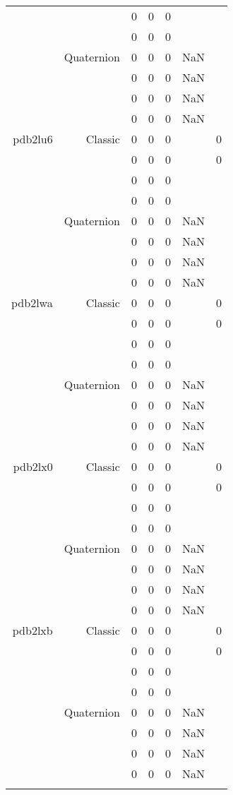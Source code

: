 \begin{xltabular}{\textwidth}{r|rcccSc}
& & 0 & 0 & 0 & & \\
& & 0 & 0 & 0 & & \\
& Quaternion & 0 & 0 & 0 & NaN & \\
& & 0 & 0 & 0 & NaN & \\
& & 0 & 0 & 0 & NaN & \\
& & 0 & 0 & 0 & NaN & \\ \addlinespace
pdb2lu6 & Classic & 0 & 0 & 0 & & 0 \\
& & 0 & 0 & 0 & & 0 \\
& & 0 & 0 & 0 & & \\
& & 0 & 0 & 0 & & \\
& Quaternion & 0 & 0 & 0 & NaN & \\
& & 0 & 0 & 0 & NaN & \\
& & 0 & 0 & 0 & NaN & \\
& & 0 & 0 & 0 & NaN & \\ \addlinespace
pdb2lwa & Classic & 0 & 0 & 0 & & 0 \\
& & 0 & 0 & 0 & & 0 \\
& & 0 & 0 & 0 & & \\
& & 0 & 0 & 0 & & \\
& Quaternion & 0 & 0 & 0 & NaN & \\
& & 0 & 0 & 0 & NaN & \\
& & 0 & 0 & 0 & NaN & \\
& & 0 & 0 & 0 & NaN & \\ \addlinespace
pdb2lx0 & Classic & 0 & 0 & 0 & & 0 \\
& & 0 & 0 & 0 & & 0 \\
& & 0 & 0 & 0 & & \\
& & 0 & 0 & 0 & & \\
& Quaternion & 0 & 0 & 0 & NaN & \\
& & 0 & 0 & 0 & NaN & \\
& & 0 & 0 & 0 & NaN & \\
& & 0 & 0 & 0 & NaN & \\ \addlinespace
pdb2lxb & Classic & 0 & 0 & 0 & & 0 \\
& & 0 & 0 & 0 & & 0 \\
& & 0 & 0 & 0 & & \\
& & 0 & 0 & 0 & & \\
& Quaternion & 0 & 0 & 0 & NaN & \\
& & 0 & 0 & 0 & NaN & \\
& & 0 & 0 & 0 & NaN & \\
& & 0 & 0 & 0 & NaN & \\ \addlinespace

\end{xltabular}
